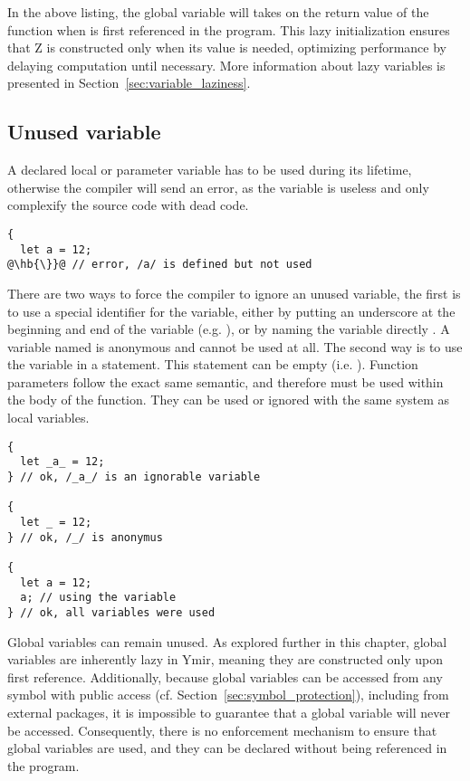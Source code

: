 In the above listing, the global variable  will takes on the return
value of the function  when  is first referenced in the
program. This lazy initialization ensures that Z is constructed only when its
value is needed, optimizing performance by delaying computation until necessary.
More information about lazy variables is presented in
Section~\ref{sec:variable_laziness}.

\subsection{Unused variable}
\label{sec:unused_variables}

A declared local or parameter variable has to be used during its lifetime,
otherwise the compiler will send an error, as the variable is useless and only
complexify the source code with dead code.

\begin{lstlisting}[style=coloredverbatim, escapechar=@]
{
  let a = 12;
@\hb{\}}@ // error, /a/ is defined but not used
\end{lstlisting}

There are two ways to force the compiler to ignore an unused variable, the first
is to use a special identifier for the variable, either by putting an underscore
at the beginning and end of the variable (e.g. ), or by naming the
variable directly \token{\_}. A variable named \token{\_} is anonymous and
cannot be used at all. The second way is to use the variable in a statement.
This statement can be empty (i.e. ). Function parameters follow the
exact same semantic, and therefore must be used within the body of the function.
They can be used or ignored with the same system as local variables.

\begin{lstlisting}[style=coloredverbatim, escapechar=@]
{
  let _a_ = 12;
} // ok, /_a_/ is an ignorable variable

{
  let _ = 12;
} // ok, /_/ is anonymus

{
  let a = 12;
  a; // using the variable
} // ok, all variables were used
\end{lstlisting}

Global variables can remain unused. As explored further in this chapter, global
variables are inherently lazy in Ymir, meaning they are constructed only upon
first reference. Additionally, because global variables can be accessed from any
symbol with public access (cf. Section~\ref{sec:symbol_protection}), including
from external packages, it is impossible to guarantee that a global variable
will never be accessed. Consequently, there is no enforcement mechanism to
ensure that global variables are used, and they can be declared without being
referenced in the program.

